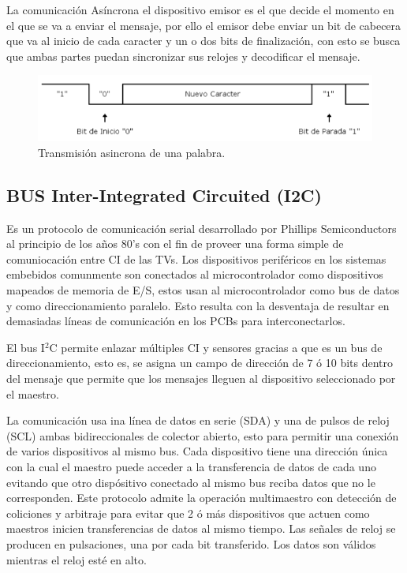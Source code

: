\documentclass[letterpaper,12pt,oneside]{book}
\begin{document}
			La comunicación Asíncrona el dispositivo emisor es el que decide el momento en el que se va a enviar el mensaje, por ello el emisor debe enviar un bit de cabecera que va al inicio de cada caracter y un o dos bits de finalización, con esto se busca que ambas partes puedan sincronizar sus relojes y decodificar el mensaje.

			\begin{figure}[!htpb]
				\centering
				\includegraphics[scale = 0.8]{Material de Consulta/AsincCom.PNG}
				\caption[Comunicación Síncrona]{Transmisión asincrona de una palabra.}
				\label{AsincCom}
			\end{figure}

			\subsection{BUS Inter-Integrated Circuited (I2C)}
			Es un protocolo de comunicación serial desarrollado por Phillips Semiconductors al principio de los años 80's con el fin de proveer una forma simple de comuniocación entre CI de las TVs. Los dispositivos periféricos en los sistemas embebidos comunmente son conectados al microcontrolador como dispositivos mapeados de memoria de E/S, estos usan al microcontrolador como bus de datos y como direccionamiento paralelo. Esto resulta con la desventaja de resultar en demasiadas líneas de comunicación en los PCBs para interconectarlos.

			El bus I$^2$C permite enlazar múltiples CI y sensores gracias a que es un bus de direccionamiento, esto es, se asigna un campo de dirección de 7 ó 10 bits dentro del mensaje que permite que los mensajes lleguen al dispositivo seleccionado por el maestro.

			La comunicación usa ina línea de datos en serie (SDA) y una de pulsos de reloj (SCL) ambas bidireccionales de colector abierto, esto para permitir una conexión de varios dispositivos al mismo bus. Cada dispositivo tiene una dirección única con la cual el maestro puede acceder a la transferencia de datos de cada uno evitando que otro dispósitivo conectado al mismo bus reciba datos que no le corresponden. Este protocolo admite la operación multimaestro con detección de coliciones y arbitraje para evitar que 2 ó más dispositivos que actuen como maestros inicien transferencias de datos al mismo tiempo. Las señales de reloj se producen en pulsaciones, una por cada bit transferido. Los datos son válidos mientras el reloj esté en alto.
\end{document}
